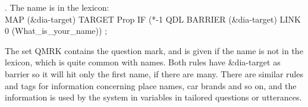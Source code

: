 \documentclass[11pt]{article}
\begin{document}
\ex.\flushleft\label{namelex} \small{The name is in the lexicon: \\
MAP (\&dia-target) TARGET Prop IF (*-1 QDL BARRIER (\&dia-target) LINK 0 (What\_is\_your\_name)) ;}

The set QMRK contains the question mark, and is given if the name is not in the lexicon, which is quite common with names. Both rules have \&dia-target as barrier so it will hit only the first name, if there are many. There are similar rules and tags for information concerning place names, car brands and so on, and the information is used by the system in variables in tailored questions or utterances.




 



 
\end{document}
